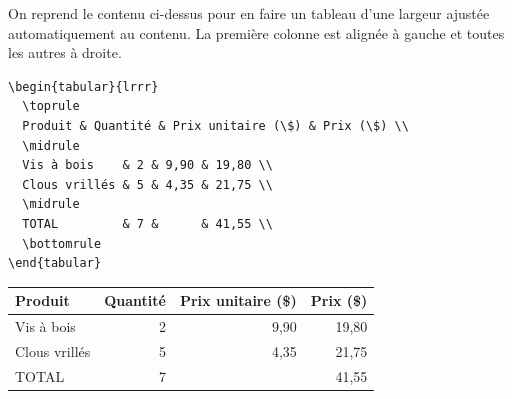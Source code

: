 \begin{exemple}
  On reprend le contenu ci-dessus pour en faire un tableau d'une
  largeur ajustée automatiquement au contenu. La première colonne est
  alignée à gauche et toutes les autres à droite.
\begin{lstlisting}
\begin{tabular}{lrrr}
  \toprule
  Produit & Quantité & Prix unitaire (\$) & Prix (\$) \\
  \midrule
  Vis à bois    & 2 & 9,90 & 19,80 \\
  Clous vrillés & 5 & 4,35 & 21,75 \\
  \midrule
  TOTAL         & 7 &      & 41,55 \\
  \bottomrule
\end{tabular}
\end{lstlisting}
  \begin{center}
    \begin{tabular}{lrrr}
      \toprule
      Produit & Quantité & Prix unitaire (\$) & Prix (\$) \\
      \midrule
      Vis à bois    & 2 & 9,90 & 19,80 \\
      Clous vrillés & 5 & 4,35 & 21,75 \\
      \midrule
      TOTAL         & 7 &      & 41,55 \\
      \bottomrule
    \end{tabular}
  \end{center}


\end{exemple}
